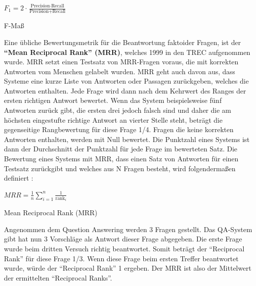 \documentclass[
        ngerman,
        paper=a4,
        numbers=noendperiod,
]{scrreprt}
\begin{document}
\begin{xequation-} 
\centering ${F_1}= 2 \cdot \frac{\text{Precision} \cdot \text{Recall}}{\text{Precision} + \text{Recall}}$
\caption[F-Maß]{F-Maß} 
    \label{eqn:FME}
\end{xequation-} 




Eine übliche Bewertungsmetrik für die Beantwortung faktoider Fragen, ist der \textbf{\enquote{Mean Reciprocal Rank} (MRR)}, welches 1999 in den TREC \citep{voorhees1999proceedings} aufgenommen wurde. MRR setzt einen Testsatz von MRR-Fragen voraus, die mit korrekten Antworten vom Menschen gelabelt wurden. MRR geht auch davon aus, dass Systeme eine kurze Liste von Antworten oder Passagen zurückgeben, welches die Antworten enthalten. Jede Frage wird dann nach dem Kehrwert des Ranges der ersten richtigen Antwort bewertet. Wenn das System beispielsweise fünf Antworten zurück gibt, die ersten drei jedoch falsch sind und daher die am höchsten eingestufte richtige Antwort an vierter Stelle steht, beträgt die gegenseitige Rangbewertung für diese Frage 1/4. Fragen die keine korrekten Antworten enthalten, werden mit Null bewertet. Die Punktzahl eines Systems ist dann der Durchschnitt der Punktzahl für jede Frage im bewerteten Satz. Die Bewertung eines Systems mit MRR, dass einen Satz von Antworten für einen Testsatz zurückgibt und welches aus N Fragen besteht, wird folgendermaßen definiert \citep [S. 483]{Jurafsky2014SpeechProcessing}:

\begin{xequation-} 
\centering ${MRR}= \frac{1}{n} \sum_{i=1}^{n} \frac{1}{\text{rank}_i}$
\caption[Mean Reciprocal Rank (MRR)]{Mean Reciprocal Rank (MRR)} 
    \label{eqn:MRR}
\end{xequation-} 

Angenommen dem Question Answering werden 3 Fragen gestellt. Das QA-System gibt hat nun 3 Vorschläge als Antwort dieser Frage abgegeben. Die erste Frage wurde beim dritten Versuch richtig beantwortet. Somit beträgt der \enquote{Reciprocal Rank} für diese Frage 1/3. Wenn diese Frage beim ersten Treffer beantwortet wurde, würde der \enquote{Reciprocal Rank} 1 ergeben. Der MRR ist also der Mittelwert der ermittelten \enquote{Reciprocal Ranks}.






\end{document}
